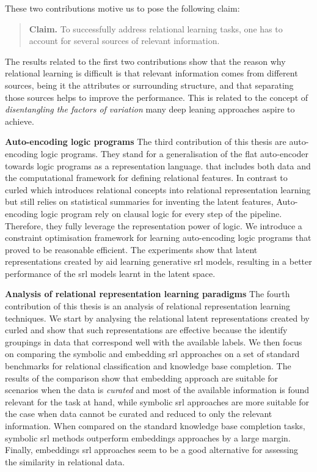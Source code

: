 These two contributions motive us to pose the following claim:

\begin{quote}
	\textbf{Claim.} To successfully address relational learning tasks, one has to account for several sources of relevant information.

\end{quote}


The results related to the first two contributions show that the reason why relational learning is difficult is that relevant information comes from different sources, being it the attributes or surrounding structure, and that separating those sources helps to improve the performance.
This is related to the concept of \textit{disentangling the factors of variation} many deep leaning approaches aspire to achieve.




\textbf{Auto-encoding logic programs}
The third contribution of this thesis are auto-encoding logic programs.
They stand for a generalisation of the flat auto-encoder towards logic programs as a representation language.
that includes both data and the computational framework for defining relational features.
In contrast to \gls{curled} which introduces relational concepts into relational representation learning but still relies on statistical summaries for inventing the latent features, Auto-encoding logic program rely on clausal logic for every step of the pipeline.
Therefore, they fully leverage the representation power of logic.
We introduce a constraint optimisation framework for learning auto-encoding logic programs that proved to be reasonable efficient.
The experiments show that latent representations created by \alp{} aid learning generative \gls{srl} models, resulting in a better performance of the \gls{srl} models learnt in the latent space.







\textbf{Analysis of relational representation learning paradigms}
The fourth contribution of this thesis is an analysis of relational representation learning techniques.
We start by analysing the relational latent representations created by \gls{curled} and show that such representations are effective because the identify groupings in data that correspond well with the available labels.
We then focus on comparing the symbolic and embedding \gls{srl} approaches on a set of standard benchmarks for relational classification and knowledge base completion.
The results of the comparison show that embedding approach are suitable for scenarios when the data is \textit{curated} and most of the available information is found relevant for the task at hand, while symbolic \gls{srl} approaches are more suitable for the case when data cannot be curated and reduced to only the relevant information.
When compared on the standard knowledge base completion tasks, symbolic \gls{srl} methods outperform embeddings approaches by a large margin.
Finally, embeddings \gls{srl} approaches seem to be a good alternative for assessing the similarity in relational data.



